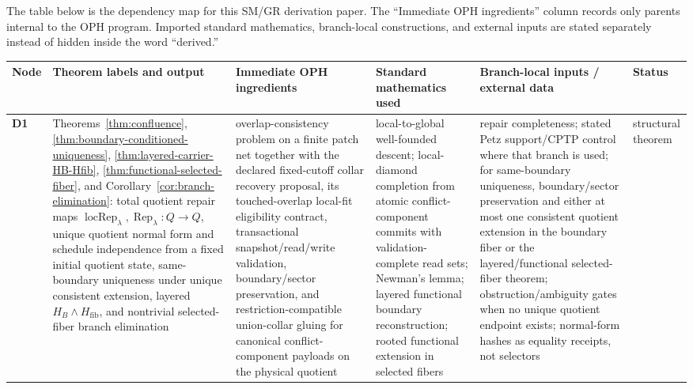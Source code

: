 \documentclass[11pt]{article}
\begin{document}
The table below is the dependency map for this SM/GR derivation paper. The ``Immediate OPH ingredients'' column records only parents internal to the OPH program. Imported standard mathematics, branch-local constructions, and external inputs are stated separately instead of hidden inside the word ``derived.''

\begingroup
\scriptsize
\setlength{\tabcolsep}{1pt}
\begin{longtable}{@{}>{\raggedright\arraybackslash}p{}>{\raggedright\arraybackslash}p{}>{\raggedright\arraybackslash}p{}>{\raggedright\arraybackslash}p{}>{\raggedright\arraybackslash}p{}>{\raggedright\arraybackslash}p{}@{}}
\toprule
Node & Theorem labels and output & Immediate OPH ingredients & Standard mathematics used & Branch-local inputs / external data & Status \\
\midrule
\endhead
\bottomrule
\endfoot
\textbf{D1} & Theorems~\ref{thm:confluence}, \ref{thm:boundary-conditioned-uniqueness}, \ref{thm:layered-carrier-HB-Hfib}, \ref{thm:functional-selected-fiber}, and Corollary~\ref{cor:branch-elimination}: total quotient repair maps \(\operatorname{locRep}_\lambda,\operatorname{Rep}_\lambda:Q\to Q\), unique quotient normal form and schedule independence from a fixed initial quotient state, same-boundary uniqueness under unique consistent extension, layered \(H_B\wedge H_{\mathrm{fib}}\), and nontrivial selected-fiber branch elimination & overlap-consistency problem on a finite patch net together with the declared fixed-cutoff collar recovery proposal, its touched-overlap local-fit eligibility contract, transactional snapshot/read/write validation, boundary/sector preservation, and restriction-compatible union-collar gluing for canonical conflict-component payloads on the physical quotient & local-to-global well-founded descent; local-diamond completion from atomic conflict-component commits with validation-complete read sets; Newman's lemma; layered functional boundary reconstruction; rooted functional extension in selected fibers & repair completeness; stated Petz support/CPTP control where that branch is used; for same-boundary uniqueness, boundary/sector preservation and either at most one consistent quotient extension in the boundary fiber or the layered/functional selected-fiber theorem; obstruction/ambiguity gates when no unique quotient endpoint exists; normal-form hashes as equality receipts, not selectors & structural theorem \\

\end{longtable}
\end{document}
